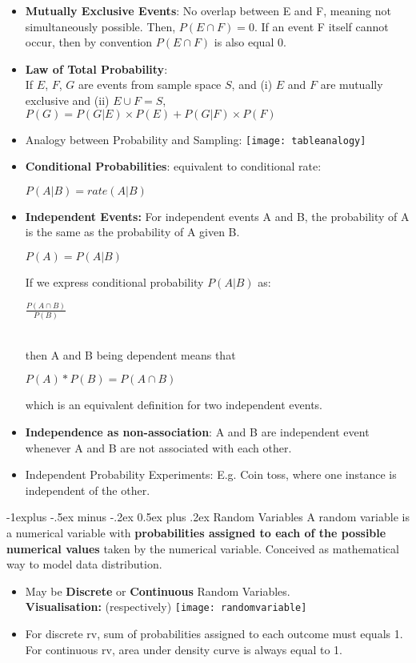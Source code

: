 \documentclass[10pt, landscape]{article}
\makeatletter
\renewcommand{\subsection}{\@startsection{subsection}{2}{0mm}%
                                {-1explus -.5ex minus -.2ex}%
                                {0.5ex plus .2ex}%
                                {\normalfont\normalsize\bfseries}}
\makeatother
\begin{document}
\begin{multicols*}{4}
\begin{itemize}
	\item \textbf{Mutually Exclusive Events}: No overlap between E and F, meaning not simultaneously possible. Then, $P(E \cap F) = 0 $. If an event F itself cannot occur, then by convention $P(E \cap F) $ is also equal 0.
	\item \textbf{Law of Total Probability}: \\
        If $E$, $F$, $G$ are events from sample space $S$, and (i) $E$ and $F$ are mutually exclusive and (ii) $E\cup F = S$,\\
        $P(G) = P(G|E) \times P(E) + P(G|F) \times P(F)$
	\item Analogy between Probability and Sampling:
	\texttt{[image: tableanalogy]}
	\item \textbf{Conditional Probabilities}: equivalent to conditional rate:
	\centerline {$P ( A \vert B ) = rate ( A \vert B ) $}
	\item \textbf{Independent Events:} For independent events A and B, the probability of A is the same as the probability of A given B.
	\centerline {$P(A) = P(A \vert B)$}
	If we express conditional probability $P(A \vert B)$ as: \\
	\centerline	{$\frac{P(A \cap B)}{P(B)} $} ~\\
	then A and B being dependent means that 
	\centerline {$ P(A) * P(B) = P(A \cap B) $}
	which is an equivalent definition for two independent events.
	\item \textbf{Independence as non-association}: A and B are independent event whenever A and B are not associated with each other.
	\item Independent Probability Experiments: E.g. Coin toss, where one instance is independent of the other.
\end{itemize}

\subsection{Random Variables}
A random variable is a numerical variable with \textbf{probabilities assigned to each of the possible numerical values} taken by the numerical variable. Conceived as mathematical way to model data distribution.
\begin{itemize}
	\item May be \textbf{Discrete} or \textbf{Continuous} Random Variables. \\
	\textbf{Visualisation:} (respectively)
	\texttt{[image: randomvariable]}
	\item For discrete rv, sum of probabilities assigned to each outcome must equals 1. For continuous rv, area under density curve is always equal to 1.
\end{itemize}



\end{multicols*}
\end{document}
